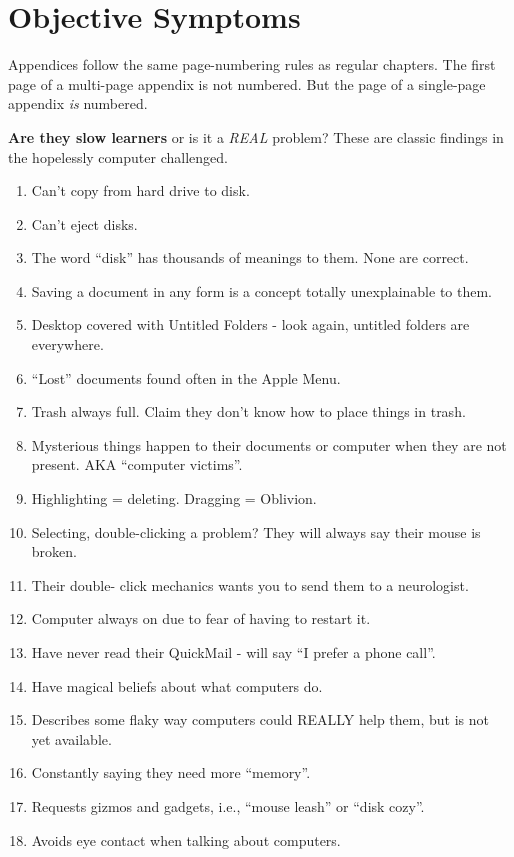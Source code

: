 \chapter{Objective Symptoms}

Appendices follow the same page-numbering rules as regular chapters. The first
page of a multi-page appendix is not numbered. But the page of a
single-page appendix {\em is} numbered.

\textbf{Are they slow learners} or is it a \emph{REAL} problem?
These are classic findings in the hopelessly computer challenged.

\begin{enumerate}

\item  Can't copy from hard drive to disk.
\item  Can't eject disks.
\item  The word ``disk'' has thousands of meanings to them. None are correct.
\item  Saving a document in any form is a concept totally unexplainable to them.
\item  Desktop covered with Untitled Folders - look again,
		untitled folders are everywhere.
\item  ``Lost'' documents found often in the Apple Menu.
\item  Trash always full. Claim they don't know how to place things in trash.
\item  Mysterious things happen to their documents or computer
	when they are not present.  AKA ``computer victims''.
\item  Highlighting = deleting. Dragging = Oblivion.
\item  Selecting, double-clicking a problem?
		They will always say their mouse is broken.
\item  Their double- click mechanics wants you to send them to a neurologist.
\item  Computer always on due to fear of having to restart it.
\item  Have never read their QuickMail - will say ``I prefer a phone call''.
\item  Have magical beliefs about what computers do.
\item  Describes some flaky way computers could REALLY help them,
		but is not yet available.
\item  Constantly saying they need more ``memory''.
\item  Requests gizmos and gadgets, i.e., ``mouse leash'' or ``disk cozy''.
\item  Avoids eye contact when talking about computers.

\end{enumerate}
